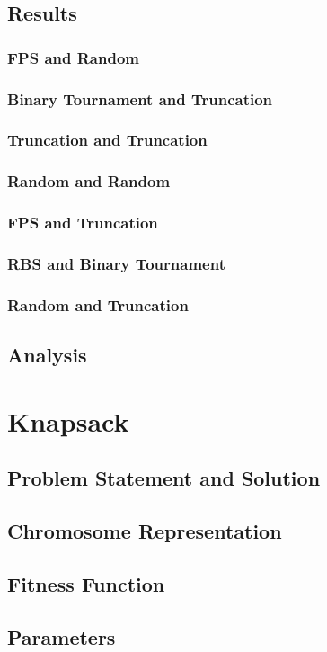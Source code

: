 \documentclass[12pt, letterpaper]{article}
\begin{document}
\subsection{Results} 
\subsubsection {FPS and Random}
\subsubsection {Binary Tournament and Truncation}
\subsubsection {Truncation and Truncation}
\subsubsection {Random and Random}
\subsubsection {FPS and Truncation}
\subsubsection {RBS and Binary Tournament}
\subsubsection {Random and Truncation}
\subsection{Analysis}

\section{Knapsack}
\subsection{Problem Statement and Solution}
\subsection{Chromosome Representation}
\subsection{Fitness Function}
\subsection{Parameters}
\end{document}
